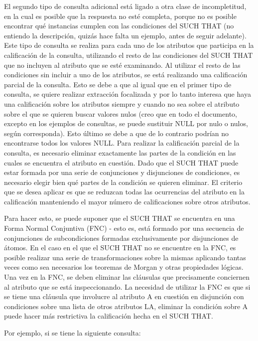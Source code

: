 El segundo tipo de consulta adicional está ligado a otra clase de incompletitud, en la cual es posible que la respuesta no esté completa, porque no es posible encontrar qué instancias cumplen con las condiciones del SUCH THAT (no entiendo la descripción, quizás hace falta un ejemplo, antes de seguir adelante). Este tipo de consulta se realiza para cada uno de los atributos que participa en la calificación de la consulta, utilizando el resto de las condiciones del SUCH THAT que no incluyen al atributo que se esté examinando. Al utilizar el resto de las condiciones sin incluir a uno de los atributos, se está realizando una calificación parcial de la consulta. Esto se debe a que al igual que en el primer tipo de consulta, se quiere realizar extracción focalizada y por lo tanto interesa que haya una calificación sobre los atributos siempre y cuando no sea sobre el atributo sobre el que se quieren buscar valores nulos (creo que en todo el documento, excepto en los ejemplos de consultas, se puede sustituir NULL por nulo o nulos, según corresponda). Esto último se debe a que de lo contrario podrían no encontrarse todos los valores NULL.
	Para realizar la calificación parcial de la consulta, es necesario eliminar exactamente las partes de la condición en las cuales se encuentra el atributo en cuestión. Dado que el SUCH THAT puede estar formada por una serie de conjunciones y disjunciones de condiciones, es necesario elegir bien qué partes de la condición se quieren eliminar. El criterio que se desea aplicar es que se reduzcan todas las ocurrencias del atributo en la calificación manteniendo el mayor número de calificaciones sobre otros atributos.

	Para hacer esto, se puede suponer que el SUCH THAT se encuentra en una Forma Normal Conjuntiva (FNC) - esto es, está formado por una secuencia de conjunciones de subcondiciones formadas exclusivamente por disjunciones  de átomos. En el caso en el que el SUCH THAT no se encuentre en la FNC, es posible realizar una serie de transformaciones sobre la mismas aplicando tantas veces como sea necesarios los teoremas de Morgan y otras propiedades lógicas. Una vez en la FNC, se deben eliminar las cláusulas que precisamente conciernen al atributo que se está inspeccionando. La necesidad de utilizar la FNC es que si se tiene una cláusula que involucre al atributo A en cuestión en disjunción con condiciones sobre una lista de otros atributos LA, eliminar la condición sobre A puede hacer más restrictiva la calificación hecha en el SUCH THAT.

	Por ejemplo, si se tiene la siguiente consulta:

